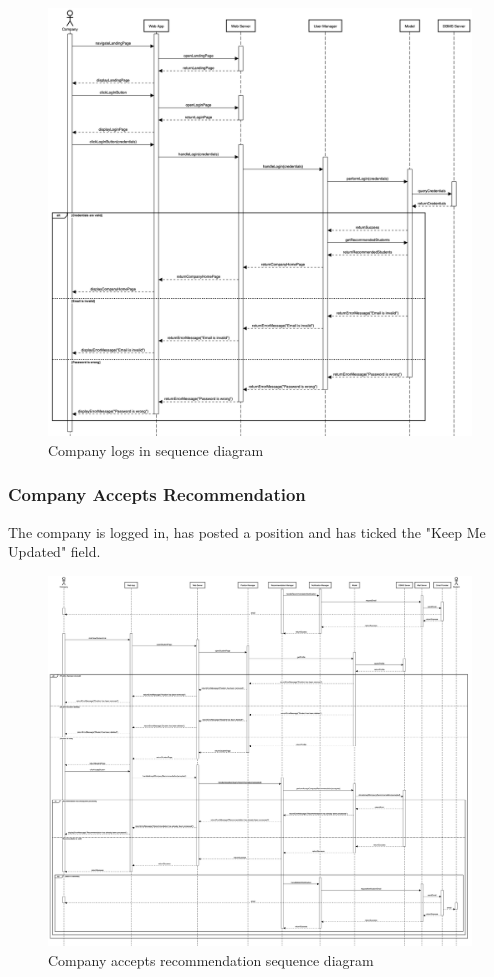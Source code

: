 \begin{figure}[h]
    \centering
    \includegraphics[width=16cm]{images/sequence-diagrams/company-logs-in.png}
    \caption{Company logs in sequence diagram}
\end{figure}

\newpage
\subsubsection{Company Accepts Recommendation}
The company is logged in, has posted a position and has ticked the "Keep Me Updated" field.

\begin{figure}[h]
    \centering
    \includegraphics[width=16cm]{images/sequence-diagrams/company-accepts-recommendation.png}
    \caption{Company accepts recommendation sequence diagram}
\end{figure}

